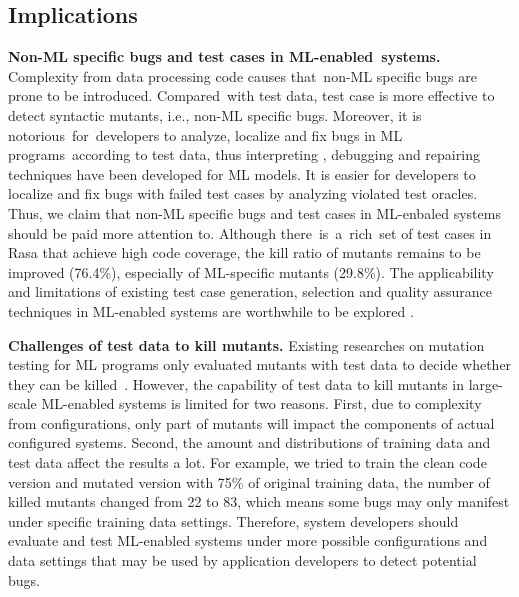 \subsection{Implications}

\textbf{Non-ML specific bugs and test cases in ML-enabled~systems.} 
Complexity from data processing code causes that~non-ML specific bugs are prone to be introduced.
Compared~with test data, test case is more effective to detect syntactic mutants, i.e., non-ML specific bugs.
Moreover, it is notorious~for~developers to analyze, localize and fix bugs in ML programs~according to test data, thus interpreting \cite{interpretability}, debugging \cite{abid2022meaningfully} and repairing \cite{sun2022causality} techniques have been developed for ML models. 
It is easier for developers to localize and fix bugs with failed test cases by analyzing violated test oracles.
Thus, we claim that non-ML specific bugs and test cases in  ML-enbaled systems should be paid more attention to.
Although there~is~a~rich~set of test cases in Rasa that achieve high code coverage, the kill ratio of mutants remains to be improved (76.4\%), especially of ML-specific mutants (29.8\%).
The applicability and limitations of existing test case generation, selection and quality assurance techniques in ML-enabled systems are worthwhile to be explored \cite{kazmi2017effective, di2013coverage}. 

% 

\textbf{Challenges of test data to kill mutants.}
Existing researches on mutation testing for ML programs only evaluated mutants with test data to decide whether they can be killed~\cite{DeepCrime,DeepMutation++,DeepMutation,mutation_evaluation,JiaMutation}.
However, the capability of test data to kill mutants in large-scale ML-enabled systems is limited for two reasons.
First, due to complexity from configurations, only part of mutants will impact the components of actual configured systems.
Second, the amount and distributions of training data and test data affect the results a lot.
For example, we tried to train the clean code version and mutated version with 75\% of original training data, the number of killed mutants changed from 22 to 83, which means some bugs may only manifest under specific training data settings. 
Therefore, system developers should evaluate and test ML-enabled systems under more possible configurations and data settings that may be used by application developers to detect potential bugs.%



